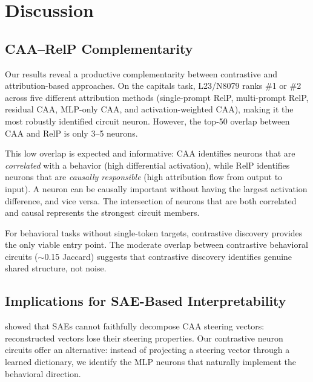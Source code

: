 \documentclass[11pt]{article}
\begin{document}
\section{Discussion}
\label{sec:discussion}

\subsection{CAA--RelP Complementarity}

Our results reveal a productive complementarity between contrastive and attribution-based approaches.
On the capitals task, L23/N8079 ranks \#1 or \#2 across five different attribution methods (single-prompt RelP, multi-prompt RelP, residual CAA, MLP-only CAA, and activation-weighted CAA), making it the most robustly identified circuit neuron.
However, the top-50 overlap between CAA and RelP is only 3--5 neurons.

This low overlap is expected and informative: CAA identifies neurons that are \emph{correlated} with a behavior (high differential activation), while RelP identifies neurons that are \emph{causally responsible} (high attribution flow from output to input).
A neuron can be causally important without having the largest activation difference, and vice versa.
The intersection of neurons that are both correlated and causal represents the strongest circuit members.

For behavioral tasks without single-token targets, contrastive discovery provides the only viable entry point.
The moderate overlap between contrastive behavioral circuits (${\sim}$0.15 Jaccard) suggests that contrastive discovery identifies genuine shared structure, not noise.

\subsection{Implications for SAE-Based Interpretability}

\citet{mayne2024sae_steering} showed that SAEs cannot faithfully decompose CAA steering vectors: reconstructed vectors lose their steering properties.
Our contrastive neuron circuits offer an alternative: instead of projecting a steering vector through a learned dictionary, we identify the MLP neurons that naturally implement the behavioral direction.
\end{document}
